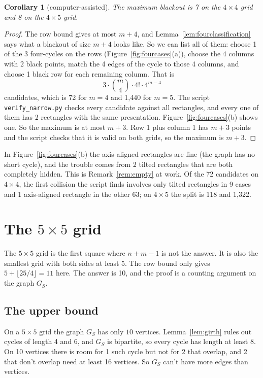 \documentclass[11pt]{article}
\newtheorem{corollary}[theorem]{Corollary}
\theoremstyle{definition}
\theoremstyle{remark}
\begin{document}
\begin{corollary}[computer-assisted]\label{cor:fourboundary}
The maximum blackout is 7 on the $4\times4$ grid and 8 on the $4\times5$ grid.
\end{corollary}

\begin{proof}
The row bound gives at most $m+4$, and Lemma~\ref{lem:fourclassification} says what a blackout
of size $m+4$ looks like. So we can list all of them: choose 1 of the 3 four-cycles on the rows
(Figure~\ref{fig:fourcases}(a)), choose the 4 columns with 2 black points, match the 4 edges of
the cycle to those 4 columns, and choose 1 black row for each remaining column. That is
\[
3\cdot\binom m4\cdot4!\cdot4^{m-4}
\]
candidates, which is 72 for $m=4$ and 1,440 for $m=5$. The script \texttt{verify\_narrow.py}
checks every candidate against all rectangles, and every one of them has 2 rectangles with the
same presentation. Figure~\ref{fig:fourcases}(b) shows one. So the maximum is at most $m+3$.
Row 1 plus column 1 has $m+3$ points and the script checks that it is valid on both grids, so the
maximum is $m+3$.
\end{proof}

In Figure~\ref{fig:fourcases}(b) the axis-aligned rectangles are fine (the graph has no short
cycle), and the trouble comes from 2 tilted rectangles that are both completely hidden. This is
Remark~\ref{rem:empty} at work. Of the 72 candidates on $4\times4$, the first collision the
script finds involves only tilted rectangles in 9 cases and 1 axis-aligned rectangle in the other
63; on $4\times5$ the split is 118 and 1,322.

\section{The $5\times5$ grid}\label{sec:five}

The $5\times5$ grid is the first square where $n+m-1$ is not the answer. It is also the smallest
grid with both sides at least 5. The row bound only gives $5+\lfloor25/4\rfloor=11$ here. The
answer is 10, and the proof is a counting argument on the graph $G_S$.

\subsection{The upper bound}

On a $5\times5$ grid the graph $G_S$ has only $10$ vertices. Lemma~\ref{lem:girth} rules out
cycles of length 4 and 6, and $G_S$ is bipartite, so every cycle has length at least 8. On 10
vertices there is room for 1 such cycle but not for 2 that overlap, and 2 that don't overlap
need at least 16 vertices. So $G_S$ can't have more edges than vertices.
\end{document}
